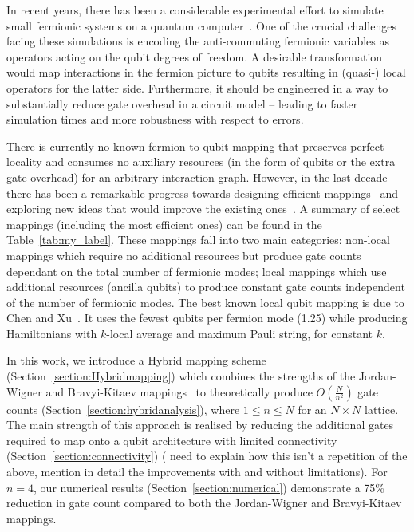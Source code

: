 \documentclass[pdftex,pra,aps,twocolumn,twoside]{revtex4-1}
\theoremstyle{plain}
\theoremstyle{note}
\newcommand\+{{\footnotesize \raisebox{0.3ex}{+}}}
\begin{document}
In recent years, there has been a considerable experimental effort to simulate small fermionic systems on a quantum computer~\cite{barends2015digital,kokail2019self}. One of the crucial challenges facing these simulations is encoding the anti-commuting fermionic variables as operators acting on the qubit degrees of freedom. A desirable transformation would map interactions in the fermion picture to qubits resulting in (quasi-) local operators for the latter side. Furthermore, it should be engineered in a way to substantially reduce gate overhead in a circuit model -- leading to faster simulation times and more robustness with respect to errors.

There is currently no known fermion-to-qubit mapping that preserves perfect locality and consumes no auxiliary resources (in the form of qubits or the extra gate overhead) for an arbitrary interaction graph. However, in the last decade there has been a remarkable progress towards designing efficient mappings~\cite{setia2019superfast,havlivcek2017operator,bravyi2002fermionic,seeley2012bravyi, derby2021compact,chen2022equivalence, steudtner2019quantum} and exploring new ideas that would improve the existing ones~\cite{chiew2021optimal}. A summary of select mappings (including the most efficient ones) can be found in the Table~\ref{tab:my_label}. These mappings fall into two main categories: { non-local mappings} which require no additional resources but produce gate counts dependant on the total number of fermionic modes; {local mappings} which use additional resources (ancilla qubits) to produce constant gate counts independent of the number of fermionic modes. The best known local qubit mapping is due to Chen and Xu~\cite{chen2022equivalence}. It uses the fewest qubits per fermion mode (1.25) while producing Hamiltonians with $k$-local average and maximum Pauli string, for constant $k$. 

In this work,  we introduce a Hybrid mapping scheme (Section~\ref{section:Hybridmapping}) which combines the strengths of the Jordan-Wigner and Bravyi-Kitaev mappings~\cite{tranter2018comparison} to theoretically produce $O(\frac{N}{n^2})$ gate counts (Section~\ref{section:hybridanalysis}), where $1\le n \le N$ for an $N\times N$ lattice. The main strength of this approach is realised by reducing the additional gates required to map onto a qubit architecture with limited connectivity (Section~\ref{section:connectivity}) ( {\color{blue} need to explain how this isn't a repetition of the above, mention in detail the improvements with and without limitations}). For $n=4$, our numerical results (Section~\ref{section:numerical}) demonstrate a 75\% reduction in gate count compared to both the Jordan-Wigner and Bravyi-Kitaev mappings.
\end{document}
